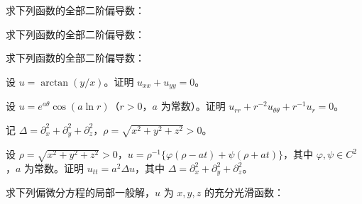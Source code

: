 \newpage
\noindent\begin{minipage}{\textwidth}
求下列函数的全部二阶偏导数：
\end{minipage}\par\vfill
\noindent\begin{minipage}{\textwidth}
求下列函数的全部二阶偏导数：
\end{minipage}\par\vfill
\noindent\begin{minipage}{\textwidth}
求下列函数的全部二阶偏导数：
\end{minipage}\par\vfill
\newpage
\noindent\begin{minipage}{\textwidth}
设 $u=\arctan(y/x)$。证明 $u_{xx}+u_{yy}=0$。
\end{minipage}\par\vfill
\noindent\begin{minipage}{\textwidth}
设 $u=e^{a\theta}\cos(a\ln r)$（$r>0$，$a$ 为常数）。证明 $u_{rr}+r^{-2}u_{\theta\theta}+r^{-1}u_r=0$。
\end{minipage}\par\vfill
\noindent\begin{minipage}{\textwidth}
记 $\Delta=\partial_x^2+\partial_y^2+\partial_z^2$，$\rho=\sqrt{x^2+y^2+z^2}>0$。
\end{minipage}\par\vfill
\newpage
\noindent\begin{minipage}{\textwidth}
设 $\rho=\sqrt{x^2+y^2+z^2}>0$，$u=\rho^{-1}\{\varphi(\rho-at)+\psi(\rho+at)\}$，其中 $\varphi,\psi\in C^2$，$a$ 为常数。证明 $u_{tt}=a^2\Delta u$，其中 $\Delta=\partial_x^2+\partial_y^2+\partial_z^2$。
\end{minipage}\par\vfill
\noindent\begin{minipage}{\textwidth}
求下列偏微分方程的局部一般解，$u$ 为 $x,y,z$ 的充分光滑函数：
\end{minipage}\par\vfill
